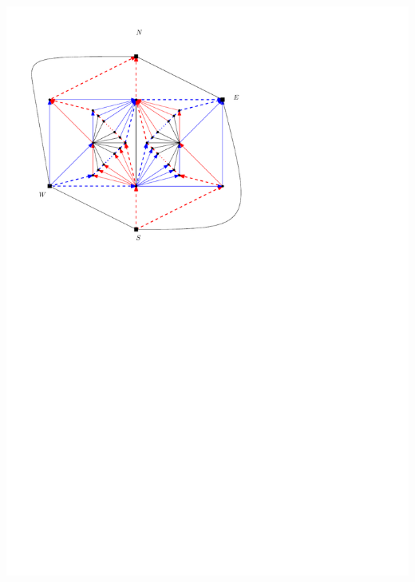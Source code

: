 \documentclass[a4paper]{article}
\begin{document}
\includegraphics[scale=.75]{fixExtension/img/manymany4}
\clearpage%
\end{document}
